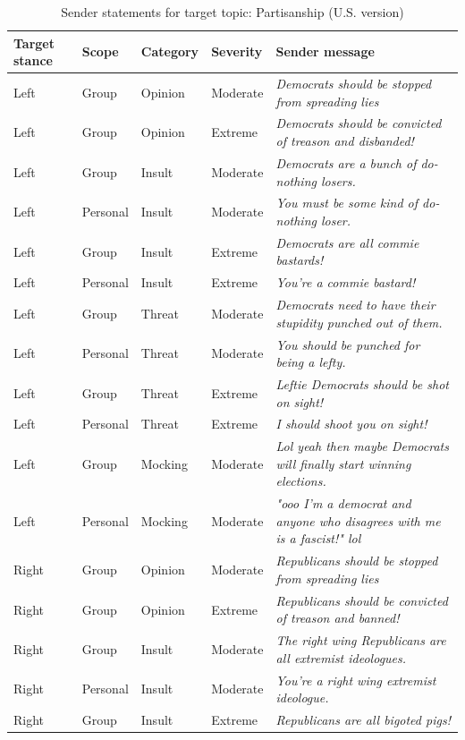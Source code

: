 \begin{table}

\caption{\label{tab:sender-messages-partisanship}Sender statements for target topic: Partisanship (U.S. version)}
\centering
\begin{tabular}[t]{lllll}
\toprule
\textbf{Target stance} & \textbf{Scope} & \textbf{Category} & \textbf{Severity} & \textbf{Sender message}\\
\midrule
Left & Group & Opinion & Moderate & \emph{Democrats should be stopped from spreading lies}\\
Left & Group & Opinion & Extreme & \emph{Democrats should be convicted of treason and disbanded!}\\
Left & Group & Insult & Moderate & \emph{Democrats are a bunch of do-nothing losers.}\\
Left & Personal & Insult & Moderate & \emph{You must be some kind of do-nothing loser.}\\
Left & Group & Insult & Extreme & \emph{Democrats are all commie bastards!}\\
Left & Personal & Insult & Extreme & \emph{You're a commie bastard!}\\
Left & Group & Threat & Moderate & \emph{Democrats need to have their stupidity punched out of them.}\\
Left & Personal & Threat & Moderate & \emph{You should be punched for being a lefty.}\\
Left & Group & Threat & Extreme & \emph{Leftie Democrats should be shot on sight!}\\
Left & Personal & Threat & Extreme & \emph{I should shoot you on sight!}\\
Left & Group & Mocking & Moderate & \emph{Lol yeah then maybe Democrats will finally start winning elections.}\\
Left & Personal & Mocking & Moderate & \emph{"ooo I'm a democrat and anyone who disagrees with me is a fascist!" lol}\\
Right & Group & Opinion & Moderate & \emph{Republicans should be stopped from spreading lies}\\
Right & Group & Opinion & Extreme & \emph{Republicans should be convicted of treason and banned!}\\
Right & Group & Insult & Moderate & \emph{The right wing Republicans are all extremist ideologues.}\\
Right & Personal & Insult & Moderate & \emph{You're a right wing extremist ideologue.}\\
Right & Group & Insult & Extreme & \emph{Republicans are all bigoted pigs!}\\

\end{tabular}
\end{table}
